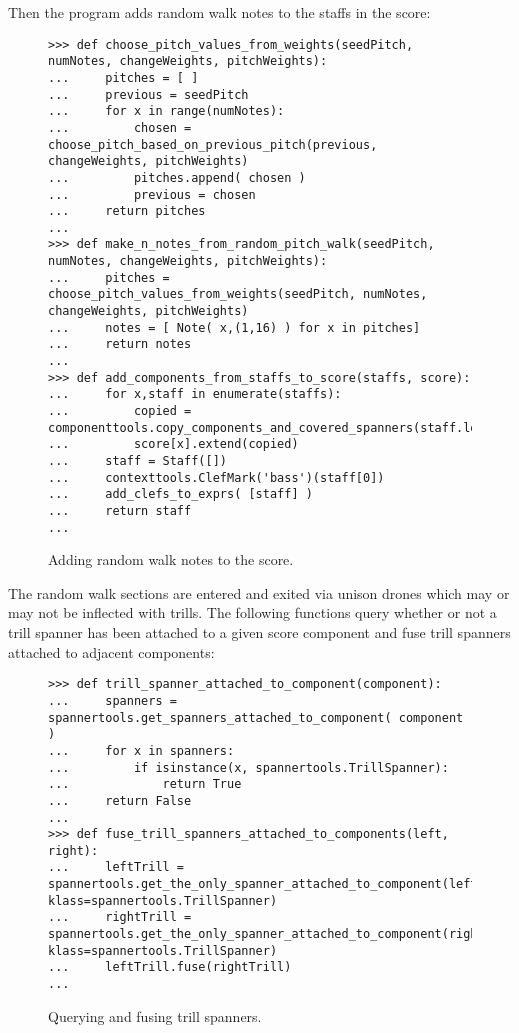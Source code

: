Then the program adds random walk notes to the staffs in the score:

\begin{figure}[H]
\begin{lstlisting}[basicstyle=\scriptsize\ttfamily, breaklines=True, tabsize=4, showtabs=false, showspaces=false]
>>> def choose_pitch_values_from_weights(seedPitch, numNotes, changeWeights, pitchWeights):
...     pitches = [ ]
...     previous = seedPitch
...     for x in range(numNotes):
...         chosen = choose_pitch_based_on_previous_pitch(previous, changeWeights, pitchWeights)
...         pitches.append( chosen )
...         previous = chosen
...     return pitches
... 
>>> def make_n_notes_from_random_pitch_walk(seedPitch, numNotes, changeWeights, pitchWeights):
...     pitches = choose_pitch_values_from_weights(seedPitch, numNotes, changeWeights, pitchWeights)
...     notes = [ Note( x,(1,16) ) for x in pitches]
...     return notes
... 
>>> def add_components_from_staffs_to_score(staffs, score):
...     for x,staff in enumerate(staffs):
...         copied = componenttools.copy_components_and_covered_spanners(staff.leaves)
...         score[x].extend(copied)
...     staff = Staff([])
...     contexttools.ClefMark('bass')(staff[0])
...     add_clefs_to_exprs( [staff] )
...     return staff
... \end{lstlisting}

\caption{Adding random walk notes to the score. } 
\end{figure}

The random walk sections are entered and exited via unison drones which may or may not be inflected with trills. The following functions query whether or not a trill spanner has been attached to a given score component and fuse trill spanners attached to adjacent components:

\begin{figure}[H]
\begin{lstlisting}[basicstyle=\scriptsize\ttfamily, breaklines=True, tabsize=4, showtabs=false, showspaces=false]
>>> def trill_spanner_attached_to_component(component):
...     spanners = spannertools.get_spanners_attached_to_component( component )
...     for x in spanners:
...         if isinstance(x, spannertools.TrillSpanner):
...             return True
...     return False
... 
>>> def fuse_trill_spanners_attached_to_components(left, right):
...     leftTrill = spannertools.get_the_only_spanner_attached_to_component(left, klass=spannertools.TrillSpanner)
...     rightTrill = spannertools.get_the_only_spanner_attached_to_component(right, klass=spannertools.TrillSpanner)
...     leftTrill.fuse(rightTrill)
... \end{lstlisting}

\caption{Querying and fusing trill spanners. } 
\end{figure}

